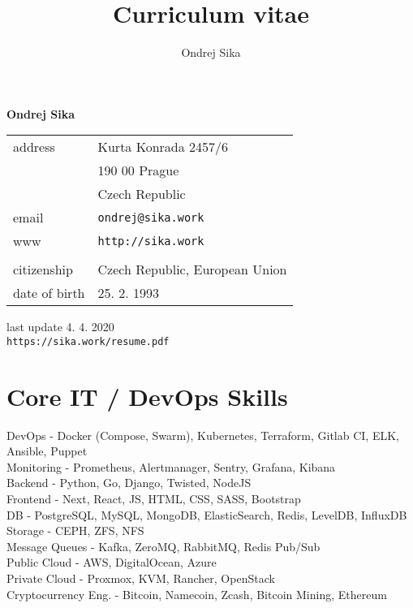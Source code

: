 \documentclass[12pt,a4paper]{article}
\title{Curriculum vitae}
\author{Ondrej Sika}
\begin{document}
\begin{center}
{\LARGE \bf Ondrej Sika}\\
\vspace*{0.2cm}
\begin{tabular}{R{7cm}L{7cm}}
address & Kurta Konrada 2457/6\\
 & 190 00 Prague\\
 & Czech Republic\\
email & \texttt{ondrej@sika.work}\\
www & \texttt{http://sika.work}\\
\\
citizenship & Czech Republic, European Union\\
date of birth & 25. 2. 1993\\
\end{tabular}

\vspace*{0.3cm}
{\hfill last update 4. 4. 2020}\\
{\hfill \texttt{https://sika.work/resume.pdf}}
\end{center}

\section*{Core IT / DevOps Skills}
DevOps - Docker (Compose, Swarm), Kubernetes, Terraform, Gitlab CI, ELK, Ansible, Puppet\\
Monitoring - Prometheus, Alertmanager, Sentry, Grafana, Kibana\\
Backend - Python, Go, Django, Twisted, NodeJS\\
Frontend - Next, React, JS, HTML, CSS, SASS, Bootstrap\\
DB - PostgreSQL, MySQL, MongoDB, ElasticSearch, Redis, LevelDB, InfluxDB\\
Storage - CEPH, ZFS, NFS\\
Message Queues - Kafka, ZeroMQ, RabbitMQ, Redis Pub/Sub\\
Public Cloud - AWS, DigitalOcean, Azure\\
Private Cloud - Proxmox, KVM, Rancher, OpenStack\\
Cryptocurrency Eng. - Bitcoin, Namecoin, Zcash, Bitcoin Mining, Ethereum\\
\end{document}
